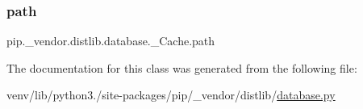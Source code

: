 \mbox{\label{classpip_1_1__vendor_1_1distlib_1_1database_1_1__Cache_a25d54db8a79caad59f7cb87ee68f2b23}} 
\subsubsection{\texorpdfstring{path}{path}}
{\footnotesize\ttfamily pip.\+\_\+vendor.\+distlib.\+database.\+\_\+\+Cache.\+path}



The documentation for this class was generated from the following file\+:\begin{DoxyCompactItemize}
\item 
venv/lib/python3./site-\/packages/pip/\+\_\+vendor/distlib/\hyperlink{database_8py}{database.\+py}\end{DoxyCompactItemize}
